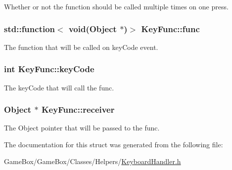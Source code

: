 \-Whether or not the function should be called multiple times on one press. 

\hypertarget{struct_key_func_ad68d4ddeedf266bd9819f5495a159ea0}{
\subsubsection[{func}]{\setlength{\rightskip}{0pt plus 5cm}std\-::function$<$ void(\-Object $\ast$)$>$ {\bf \-Key\-Func\-::func}}}\label{struct_key_func_ad68d4ddeedf266bd9819f5495a159ea0}


\-The function that will be called on key\-Code event. 

\hypertarget{struct_key_func_a8683decc234b65cee973ca74b2257a99}{
\subsubsection[{key\-Code}]{\setlength{\rightskip}{0pt plus 5cm}int {\bf \-Key\-Func\-::key\-Code}}}\label{struct_key_func_a8683decc234b65cee973ca74b2257a99}


\-The key\-Code that will call the func. 

\hypertarget{struct_key_func_addf45cdc46b86985f56783f52cd45c6f}{
\subsubsection[{receiver}]{\setlength{\rightskip}{0pt plus 5cm}\-Object $\ast$ {\bf \-Key\-Func\-::receiver}}}\label{struct_key_func_addf45cdc46b86985f56783f52cd45c6f}


\-The \-Object pointer that will be passed to the func. 



\-The documentation for this struct was generated from the following file\-:\begin{DoxyCompactItemize}
\item 
\-Game\-Box/\-Game\-Box/\-Classes/\-Helpers/\hyperlink{_keyboard_handler_8h}{\-Keyboard\-Handler.\-h}\end{DoxyCompactItemize}

